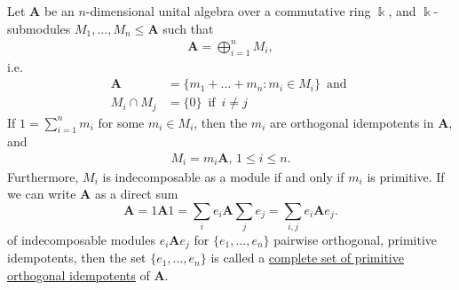 \begin{proposition}
Let $\mathbf{A}$ be an $n$-dimensional unital algebra over a commutative ring $\Bbbk$, and $\Bbbk$-submodules
$M_{1},\dots,M_{n} \leq \mathbf{A}$ such that
\begin{align}
\mathbf{A} = \bigoplus_{i=1}^{n} M_{i},
\end{align}
i.e.
\begin{align}
\mathbf{A} &= \{ m_{1} + \dots + m_{n} : m_{i} \in M_{i} \}\, \text{ and }\\
M_{i} \cap M_{j} &= \{0\}\, \text{ if }\, i\neq j 
\end{align}
If $1 = \sum_{i=1}^{n} m_{i}$ for some $m_{i} \in M_{i}$, then the $m_{i}$ are orthogonal idempotents in $\mathbf{A}$, and
\begin{align}
M_{i} = m_{i}\mathbf{A},\, 1\leq i \leq n.
\end{align}
Furthermore, $M_{i}$ is indecomposable as a module if and only if $m_{i}$ is primitive.
If we can write $\mathbf{A}$ as a direct sum
\[
\mathbf{A} = 1\mathbf{A}1 = \sum_{i}e_{i} \mathbf{A} \sum_{j} e_{j} = \sum_{i,j} e_{i}\mathbf{A}e_{j}.
\]
of indecomposable modules $e_{i}\mathbf{A}e_{j}$ for $\{e_{1},\dots,e_{n}\}$ pairwise orthogonal, primitive idempotents, then the
set $\{e_{1},\dots,e_{n}\}$ is called a \ul{complete set of primitive orthogonal idempotents} of $\mathbf{A}$. 
\end{proposition}
